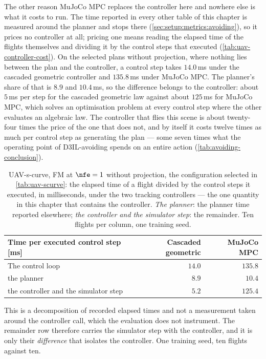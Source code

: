 The other reason MuJoCo MPC replaces the controller here and nowhere else is what it costs to run. The
time reported in every other table of this chapter is measured around the planner and stops there
(\autoref{sec:setup:metrics:avoiding}), so it prices no controller at all; pricing one means reading the
elapsed time of the flights themselves and dividing it by the control steps that executed
(\autoref{tab:uav-controller-cost}). On the selected plans without projection, where nothing lies between
the plan and the controller, a control step takes $14.0$\,ms under the cascaded geometric controller and
$135.8$\,ms under MuJoCo MPC. The planner's share of that is $8.9$ and $10.4$\,ms, so the difference belongs to
the controller: about $5$\,ms per step for the cascaded geometric law against about $125$\,ms for MuJoCo MPC,
which solves an optimisation problem at every control step where the other evaluates an algebraic law. The
controller that flies this scene is about twenty-four times the price of the one that does not, and by itself
it costs twelve times as much per control step as generating the plan --- some seven times what the operating
point of D3IL-avoiding spends on an entire action (\autoref{tab:avoiding-conclusion}).

\begin{table}[htpb]
  \caption[UAV-s-curve: what each tracking controller costs per control step]{UAV-s-curve, FM at
  $\nfe=1$ without projection, the configuration selected in \autoref{tab:uav-scurve}: the elapsed time of a
  flight divided by the control steps it executed, in milliseconds, under the two tracking controllers ---
  the one quantity in this chapter that contains the controller. \emph{The planner}: the planner time reported
  elsewhere; \emph{the controller and the simulator step}: the remainder. Ten flights per column, one training
  seed.}
  \label{tab:uav-controller-cost}
  \centering
  \small
  \begin{tabularx}{\linewidth}{@{}L r r@{}}
    \toprule
    Time per executed control step [ms] & Cascaded geometric & MuJoCo MPC \\
    \midrule
    The control loop                          & $14.0$ & $135.8$ \\
    \quad the planner                         & $8.9$ & $10.4$ \\
    \quad the controller and the simulator step & $5.2$ & $125.4$ \\
    \bottomrule
  \end{tabularx}
\end{table}
This is a decomposition of recorded elapsed times and not a measurement taken around the
controller call, which the evaluation does not instrument. The remainder row therefore carries the
simulator step with the controller, and it is only their \emph{difference} that isolates the controller.
One training seed, ten flights against ten.

